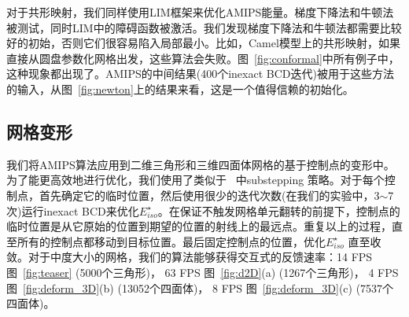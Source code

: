 对于共形映射，我们同样使用LIM框架来优化AMIPS能量。梯度下降法和牛顿法被测试，同时LIM中的障碍函数被激活。我们发现梯度下降法和牛顿法都需要比较好的初始，否则它们很容易陷入局部最小。比如，Camel模型上的共形映射，如果直接从圆盘参数化网格出发，这些算法会失败。图~\ref{fig:conformal}中所有例子中，这种现象都出现了。AMIPS的中间结果(400个inexact BCD迭代)被用于这些方法的输入，从图~\ref{fig:newton}上的结果来看，这是一个值得信赖的初始化。

\subsection{网格变形}
我们将AMIPS算法应用到二维三角形和三维四面体网格的基于控制点的变形中。为了能更高效地进行优化，我们使用了类似于~\cite{Schuller2013} 中substepping 策略。对于每个控制点，首先确定它的临时位置，然后使用很少的迭代次数(在我们的实验中，3$\sim$7 次)运行inexact BCD来优化$E^{\star}_{iso}$。在保证不触发网格单元翻转的前提下，控制点的临时位置是从它原始的位置到期望的位置的射线上的最远点。重复以上的过程，直至所有的控制点都移动到目标位置。最后固定控制点的位置，优化$E^{\star}_{iso}$ 直至收敛。对于中度大小的网格，我们的算法能够获得交互式的反馈速率：14 FPS 图~\ref{fig:teaser} (5000个三角形)， 63 FPS 图~\ref{fig:d2D}(a) (1267个三角形)， 4 FPS 图~\ref{fig:deform_3D}(b) (13052个四面体)， 8 FPS 图~\ref{fig:deform_3D}(c) (7537个四面体)。

